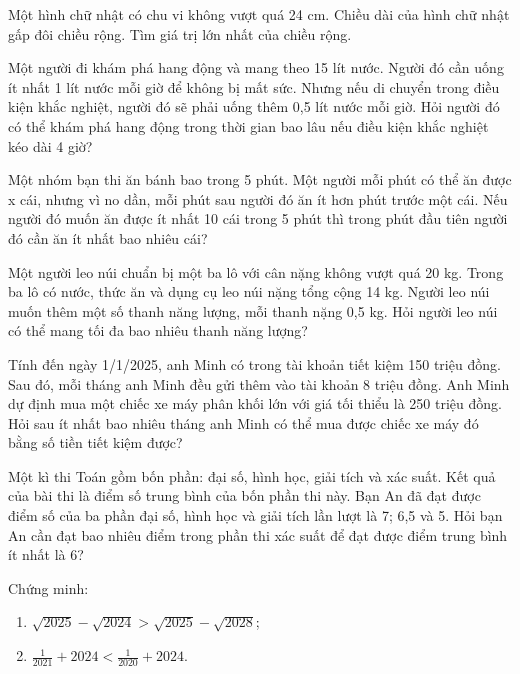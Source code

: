 \documentclass[%
    fontsize=12pt,%
    chapterprefix=false,%
    open=right,%
    twoside=false,%
    numbers=noenddot,%
    headings=optiontohead,%
    final,%
    DIV=15,%
    parskip=half %
]{scrbook}
\begin{document}
\begin{tuluan}
\item Một hình chữ nhật có chu vi không vượt quá 24 cm. Chiều dài của hình chữ nhật gấp đôi chiều rộng. Tìm giá trị lớn nhất của chiều rộng.

\item Một người đi khám phá hang động và mang theo 15 lít nước. Người đó cần uống ít nhất 1 lít nước mỗi giờ để không bị mất sức. Nhưng nếu di chuyển trong điều kiện khắc nghiệt, người đó sẽ phải uống thêm 0,5 lít nước mỗi giờ. Hỏi người đó có thể khám phá hang động trong thời gian bao lâu nếu điều kiện khắc nghiệt kéo dài 4 giờ?

\item Một nhóm bạn thi ăn bánh bao trong 5 phút. Một người mỗi phút có thể ăn được x cái, nhưng vì no dần, mỗi phút sau người đó ăn ít hơn phút trước một cái. Nếu người đó muốn ăn được ít nhất 10 cái trong 5 phút thì trong phút đầu tiên người đó cần ăn ít nhất bao nhiêu cái?

\item Một người leo núi chuẩn bị một ba lô với cân nặng không vượt quá 20 kg. Trong ba lô có nước, thức ăn và dụng cụ leo núi nặng tổng cộng 14 kg. Người leo núi muốn thêm một số thanh năng lượng, mỗi thanh nặng 0,5 kg. Hỏi người leo núi có thể mang tối đa bao nhiêu thanh năng lượng?

\item Tính đến ngày 1/1/2025, anh Minh có trong tài khoản tiết kiệm 150 triệu đồng. Sau đó, mỗi tháng anh Minh đều gửi thêm vào tài khoản 8 triệu đồng. Anh Minh dự định mua một chiếc xe máy phân khối lớn với giá tối thiểu là 250 triệu đồng. Hỏi sau ít nhất bao nhiêu tháng anh Minh có thể mua được chiếc xe máy đó bằng số tiền tiết kiệm được?

\item Một kì thi Toán gồm bốn phần: đại số, hình học, giải tích và xác suất. Kết quả của bài thi là điểm số trung bình của bốn phần thi này. Bạn An đã đạt được điểm số của ba phần đại số, hình học và giải tích lần lượt là 7; 6,5 và 5. Hỏi bạn An cần đạt bao nhiêu điểm trong phần thi xác suất để đạt được điểm trung bình ít nhất là 6?

\item Chứng minh:
\begin{enumerate}[label=\alph*)]
  \item[a)] $ \sqrt{2025} - \sqrt{2024} > \sqrt{2025} - \sqrt{2028} $;
  \item[b)] $ \frac{1}{2021} + 2024 < \frac{1}{2020} + 2024 $.
\end{enumerate}


\end{tuluan}
\end{document}
